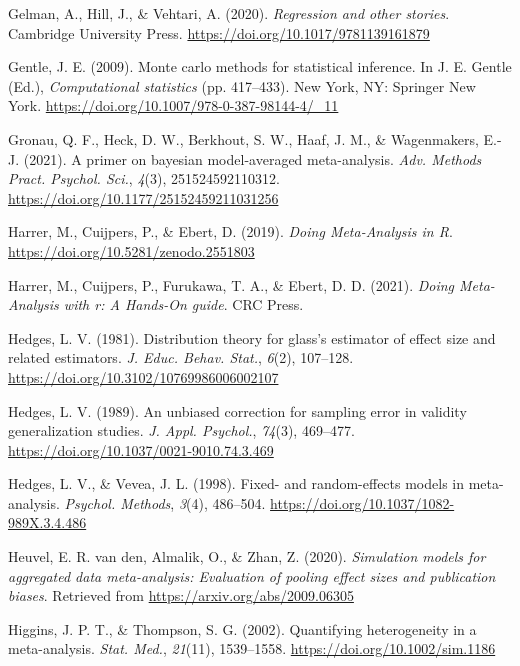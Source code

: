 \documentclass[
  man,floatsintext]{apa6}
\newlength{\cslhangindent}
\newenvironment{CSLReferences}[2] %
 {\begin{list}{}{%
  \setlength{\itemindent}{0pt}
  \setlength{\leftmargin}{0pt}
  \setlength{\parsep}{0pt}
  \ifodd #1
   \setlength{\leftmargin}{\cslhangindent}
   \setlength{\itemindent}{-1\cslhangindent}
  \fi
  \setlength{\itemsep}{#2\baselineskip}}}
 {\end{list}}
\begin{document}
\begin{CSLReferences}{1}{0}
Gelman, A., Hill, J., \& Vehtari, A. (2020). \emph{Regression and other stories}. Cambridge University Press. \url{https://doi.org/10.1017/9781139161879}

Gentle, J. E. (2009). Monte carlo methods for statistical inference. In J. E. Gentle (Ed.), \emph{Computational statistics} (pp. 417--433). New York, NY: Springer New York. \url{https://doi.org/10.1007/978-0-387-98144-4/_11}

Gronau, Q. F., Heck, D. W., Berkhout, S. W., Haaf, J. M., \& Wagenmakers, E.-J. (2021). A primer on bayesian model-averaged meta-analysis. \emph{Adv. Methods Pract. Psychol. Sci.}, \emph{4}(3), 251524592110312. \url{https://doi.org/10.1177/25152459211031256}

Harrer, M., Cuijpers, P., \& Ebert, D. (2019). \emph{Doing {Meta-Analysis} in {R}}. \url{https://doi.org/10.5281/zenodo.2551803}

Harrer, M., Cuijpers, P., Furukawa, T. A., \& Ebert, D. D. (2021). \emph{Doing {Meta-Analysis} with r: A {Hands-On} guide}. CRC Press.

Hedges, L. V. (1981). Distribution theory for glass's estimator of effect size and related estimators. \emph{J. Educ. Behav. Stat.}, \emph{6}(2), 107--128. \url{https://doi.org/10.3102/10769986006002107}

Hedges, L. V. (1989). An unbiased correction for sampling error in validity generalization studies. \emph{J. Appl. Psychol.}, \emph{74}(3), 469--477. \url{https://doi.org/10.1037/0021-9010.74.3.469}

Hedges, L. V., \& Vevea, J. L. (1998). Fixed- and random-effects models in meta-analysis. \emph{Psychol. Methods}, \emph{3}(4), 486--504. \url{https://doi.org/10.1037/1082-989X.3.4.486}

Heuvel, E. R. van den, Almalik, O., \& Zhan, Z. (2020). \emph{Simulation models for aggregated data meta-analysis: Evaluation of pooling effect sizes and publication biases}. Retrieved from \url{https://arxiv.org/abs/2009.06305}

Higgins, J. P. T., \& Thompson, S. G. (2002). Quantifying heterogeneity in a meta-analysis. \emph{Stat. Med.}, \emph{21}(11), 1539--1558. \url{https://doi.org/10.1002/sim.1186}


\end{CSLReferences}
\end{document}
